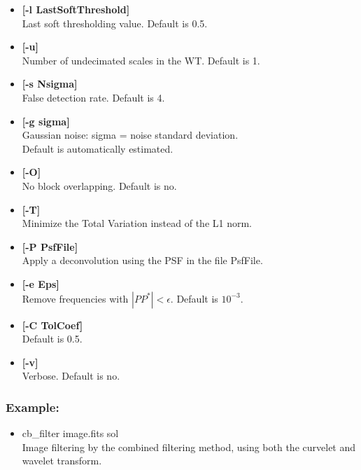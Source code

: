 \begin{itemize}
\item {\bf  [-l LastSoftThreshold]} \\
Last soft thresholding value. Default is 0.5.

\item {\bf  [-u]} \\
 Number of undecimated scales in the WT.
 Default is 1. 

\item {\bf [-s Nsigma]} \\
False detection rate. Default is 4.

\item {\bf [-g sigma]} \\
Gaussian noise: sigma = noise standard deviation.  \\
 Default is automatically estimated.


\item {\bf [-O]}  \\
No block overlapping. Default is no.

\item {\bf [-T]}  \\
 Minimize the Total Variation instead of the L1 norm. 

\item {\bf [-P PsfFile]}  \\
Apply a deconvolution using the PSF in the file PsfFile. 

\item {\bf [-e Eps]}  \\
 Remove frequencies with $|P P^*| < \epsilon $. 
 Default is $10^{-3}$.

\item {\bf [-C TolCoef]}  \\
 Default is 0.5. 

\item {\bf [-v]} \\
Verbose. Default is no.
\end{itemize}

\subsubsection*{Example:}
\begin{itemize}
\item cb\_filter image.fits sol\\
Image filtering by the combined filtering method, using both
the curvelet and wavelet transform.
\end{itemize}



